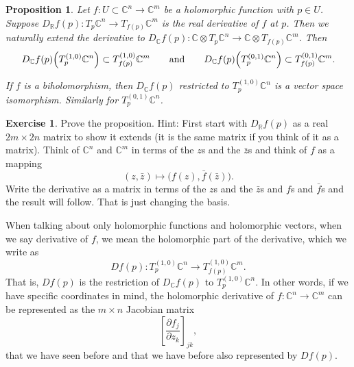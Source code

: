 \documentclass[12pt,openany]{book}
\newcommand{\C}{{\mathbb{C}}}
\newcommand{\R}{{\mathbb{R}}}
\theoremstyle{plain}
\newtheorem{prop}[thm]{Proposition}
\theoremstyle{remark}
\theoremstyle{definition}
\newenvironment{exbox}{%
    \def\FrameCommand{\vrule width 1pt \relax\hspace {10pt}}%
    \MakeFramed {\advance \hsize -\width \FrameRestore }%
}{%
    \endMakeFramed
}
\theoremstyle{exercise}
\newtheorem{exercise}{Exercise}[section]
\theoremstyle{example}
\begin{document}
\begin{prop} \label{prop:holvectmap}
Let $f \colon U \subset \C^n \to \C^m$ be a holomorphic function with
$p \in U$.
Suppose 
$D_\R f(p) \colon T_p\C^n \to T_{f(p)} \C^m$
is the real derivative of $f$ at $p$.
Then we naturally
extend the derivative to $D_\C f(p) \colon \C \otimes T_p\C^n \to \C \otimes  T_{f(p)}
\C^m$.  Then
\begin{equation*}
D_\C f(p)\Bigl(T_p^{(1,0)} \C^n\Bigr) \subset T_{f(p)}^{(1,0)} \C^m
\qquad \text{and} \qquad
D_\C f(p)\Bigl(T_p^{(0,1)} \C^n\Bigr) \subset T_{f(p)}^{(0,1)} \C^m .
\end{equation*}

If $f$ is a biholomorphism, then $D_\C f(p)$ restricted to $T_p^{(1,0)} \C^n$
is a vector space isomorphism.  Similarly for $T_p^{(0,1)} \C^n$.
\end{prop}

\begin{exbox}
\begin{exercise}
Prove the proposition.
Hint: First start with $D_\R f(p)$ as a real $2m \times 2n$ matrix to show it
extends (it is the same matrix if you think of it as a matrix).  Think of $\C^n$ and $\C^m$ in terms of the $z$s and the
$\bar{z}$s and think of $f$ as a mapping
\begin{equation*}
(z,\bar{z}) \mapsto \bigl( f(z) , \bar{f}(\bar{z}) \bigr) .
\end{equation*}
Write the derivative as a matrix in terms of the $z$s and the $\bar{z}$s
and $f$s and $\bar{f}$s and the result will follow.  That is just changing
the basis.
\end{exercise}
\end{exbox}

When talking about only holomorphic functions and holomorphic vectors,
when we say derivative of $f$, we mean the holomorphic part of the
derivative, which we write as
\begin{equation*}
D f(p) \colon T_p^{(1,0)} \C^n \to T_{f(p)}^{(1,0)} \C^m .
\end{equation*}
That is, $Df(p)$ is the restriction of $D_\C f(p)$ to $T_p^{(1,0)} \C^n$.
In other words,
if we have specific coordinates in mind, the
holomorphic derivative of $f \colon \C^{n} \to \C^m$ can be represented
as the $m \times n$ Jacobian matrix
\begin{equation*}
\left[
\frac{\partial f_j}{\partial z_k}
\right]_{jk} ,
\end{equation*}
that we have seen before and that we have before also represented by
$Df(p)$.
\end{document}
